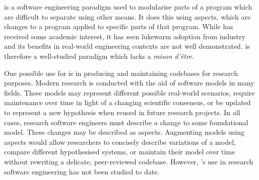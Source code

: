 
    \Aop{} is a software engineering paradigm used to modularise parts of a
    program which are difficult to separate using other means. It does this
    using aspects, which are changes to a program applied to specific parts of
    that program. While \aop{} has received some academic interest, it has seen
    lukewarm adoption from industry and its benefits in real-world engineering
    contexts are not well demonstrated. \Aop{} is therefore a well-studied
    paradigm which lacks a \emph{raison d'\^etre}.
    
    One possible use for \aop{} is in producing and maintaining codebases for
    research purposes. Modern research is conducted with the aid of software
    models in many fields. These models may represent different possible
    real-world scenarios, require maintenance over time in light of a changing
    scientific consensus, or be updated to represent a new hypothesis when
    reused in future research projects. In all cases, research software
    engineers must describe a change to some foundational model. These changes
    may be described as aspects. Augmenting models using aspects would allow
    researchers to concisely describe variations of a model, compare different
    hypothesised systems, or maintain their model over time without rewriting a
    delicate, peer-reviewed codebase. However, \aop{}'s use in research software
    engineering has not been studied to date.





